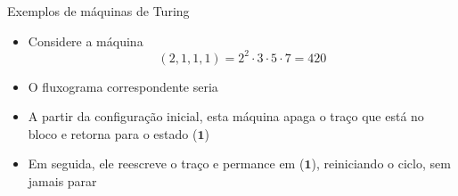 \begin{frame}[fragile]{Exemplos de máquinas de Turing}

    \begin{itemize}
        \item Considere a máquina 
        \[
            (2, 1, 1, 1) = 2^2\cdot 3\cdot 5\cdot 7 = 420
        \]

        \item O fluxograma correspondente seria

    \begin{figure}[h]
        \centering
    \end{figure}

        \item A partir da configuração inicial, esta máquina apaga o traço que está no bloco e
            retorna para o estado ($\mathbf{1}$)

        \item Em seguida, ele reescreve o traço e permance em ($\mathbf{1}$), reiniciando o ciclo,
            sem jamais parar
    \end{itemize}

\end{frame}

